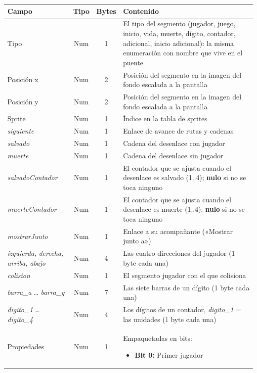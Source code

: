\begin{table}[H]
	\centering
	\begin{tabular}{|l|c|c|p{8.4cm}|}
		\hline
		\textbf{Campo} & \textbf{Tipo} & \textbf{Bytes} & \textbf{Contenido} \\
		\hline
		
		Tipo & Num & 1 & El tipo del segmento (jugador, juego, inicio, vida,
		muerte, dígito, contador, adicional, inicio adicional): la misma enumeración con nombre que vive en el puente \\
		\hline
		Posición x & Num & 2 & Posición del segmento en la imagen del fondo escalada a la pantalla \\
		\hline
		Posición y & Num & 2 & Posición del segmento en la imagen del fondo escalada a la pantalla \\
		\hline
		Sprite & Num & 1 & Índice en la tabla de sprites \\
		\hline
		\emph{siguiente} & Num & 1 & Enlace de avance de rutas y cadenas \\
		\hline
		\emph{salvado} & Num & 1 & Cadena del desenlace con jugador \\
		\hline
		\emph{muerte} & Num & 1 & Cadena del desenlace sin jugador \\
		\hline
		\emph{salvadoContador} & Num & 1 & El contador que se ajusta cuando el desenlace es salvado (1..4); \textbf{nulo} si no se toca ninguno \\
		\hline
		\emph{muerteContador} & Num & 1 & El contador que se ajusta cuando el desenlace es muerte (1..4); \textbf{nulo} si no se toca ninguno \\
		\hline
		\emph{mostrarJunto} & Num & 1 & Enlace a su acompañante («Mostrar junto a») \\
		\hline
		\emph{izquierda, derecha, arriba, abajo} & Num & 4 & Las cuatro direcciones del jugador (1 byte cada una) \\
		\hline
		\emph{colision} & Num & 1 & El segmento jugador con el que colisiona \\
		\hline
		\emph{barra\_a} \ldots{} \emph{barra\_g} & Num & 7 & Las siete barras de un dígito (1 byte cada una) \\
		\hline
		\emph{digito\_1} \ldots{} \emph{digito\_4} & Num & 4 & Los dígitos de un contador, \emph{digito\_1} = las unidades (1 byte cada una) \\
		\hline
		Propiedades & Num & 1 & Empaquetadas en bits:
		\begin{itemize}
			\item \textbf{Bit 0:} Primer jugador

\end{itemize}
\end{tabular}
\end{table}
